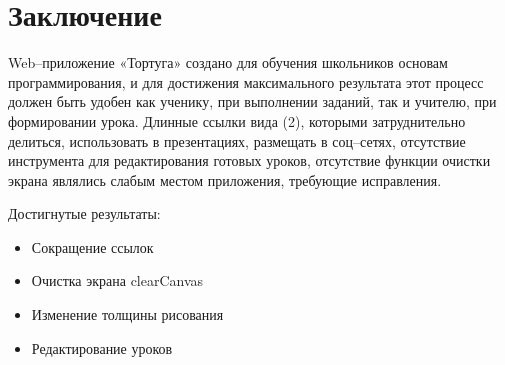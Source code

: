\chapter*{Заключение}						%

Web–приложение «Тортуга» создано для обучения школьников основам программирования, и для достижения максимального результата этот процесс должен быть удобен как ученику, при выполнении заданий, так и учителю, при формировании урока. Длинные ссылки вида (2), которыми затруднительно делиться, использовать в презентациях, размещать в соц–сетях, отсутствие инструмента для редактирования готовых уроков, отсутствие функции очистки экрана являлись слабым местом приложения, требующие исправления.\par
\vspace{16mm}
Достигнутые результаты:
\begin{itemize}
  \item Сокращение ссылок
  \item Очистка экрана clearCanvas
  \item Изменение толщины рисования
  \item Редактирование уроков
\end{itemize}


\clearpage